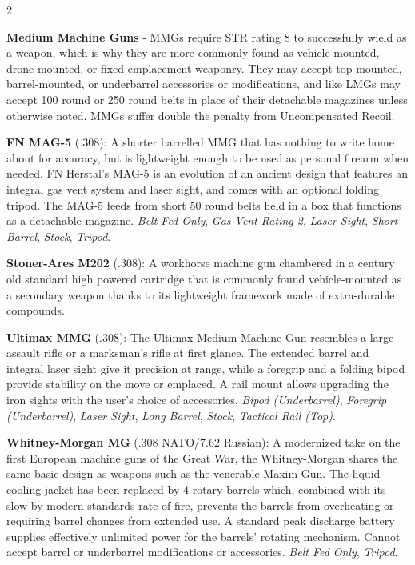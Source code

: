 \documentclass[
  oneside]{article}
\begin{document}
\begin{multicols}{2}

\textbf{Medium Machine Guns} - MMGs require STR
rating 8 to successfully wield as a weapon, which
is why they are more commonly found as vehicle
mounted, drone mounted, or fixed emplacement
weaponry. They may accept top-mounted,
barrel-mounted, or underbarrel accessories or
modifications, and like LMGs may accept 100 round
or 250 round belts in place of their detachable
magazines unless otherwise noted. MMGs suffer
double the penalty from Uncompensated Recoil.

\textbf{FN MAG-5} (.308): A shorter barrelled MMG
that has nothing to write home about for accuracy,
but is lightweight enough to be used as personal
firearm when needed. FN Herstal's MAG-5 is an
evolution of an ancient design that features an
integral gas vent system and laser sight, and
comes with an optional folding tripod. The MAG-5
feeds from short 50 round belts held in a box that
functions as a detachable magazine. \emph{Belt Fed
Only}, \emph{Gas Vent Rating 2}, \emph{Laser
Sight}, \emph{Short Barrel}, \emph{Stock},
\emph{Tripod}.

\textbf{Stoner-Ares M202} (.308): A workhorse
machine gun chambered in a century old standard
high powered cartridge that is commonly found
vehicle-mounted as a secondary weapon thanks to
its lightweight framework made of extra-durable
compounds.

\textbf{Ultimax MMG} (.308): The Ultimax Medium
Machine Gun resembles a large assault rifle or a
marksman's rifle at first glance. The extended
barrel and integral laser sight give it precision
at range, while a foregrip and a folding bipod
provide stability on the move or emplaced. A rail
mount allows upgrading the iron sights with the
user's choice of accessories. \emph{Bipod
(Underbarrel)}, \emph{Foregrip (Underbarrel)},
\emph{Laser Sight}, \emph{Long Barrel},
\emph{Stock}, \emph{Tactical Rail (Top)}.

\textbf{Whitney-Morgan MG} (.308 NATO/7.62
Russian): A modernized take on the first European
machine guns of the Great War, the Whitney-Morgan
shares the same basic design as weapons such as
the venerable Maxim Gun. The liquid cooling jacket
has been replaced by 4 rotary barrels which,
combined with its slow by modern standards rate of
fire, prevents the barrels from overheating or
requiring barrel changes from extended use. A
standard peak discharge battery supplies
effectively unlimited power for the barrels'
rotating mechanism. Cannot accept barrel or
underbarrel modifications or accessories.
\emph{Belt Fed Only}, \emph{Tripod}.

\end{multicols}
\end{document}
